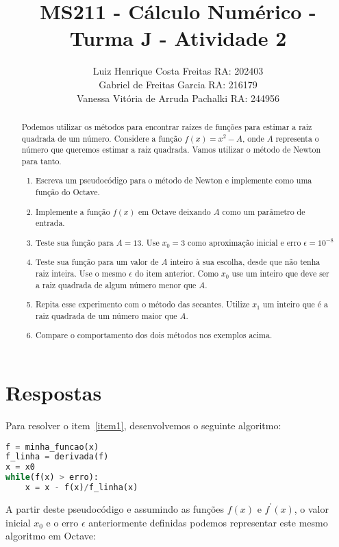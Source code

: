 \documentclass[a4paper]{article}
\title{MS211 - Cálculo Numérico - Turma J - Atividade 2
}
\author{Luiz Henrique Costa Freitas RA: 202403 \\
        Gabriel de Freitas Garcia RA: 216179 \\
        Vanessa Vitória de Arruda Pachalki RA: 244956
}
\begin{document}
\renewcommand{\abstractname}{Enunciado Atividade 2}
\maketitle

\begin{abstract}
Podemos utilizar os métodos para encontrar raízes de funções para estimar a raiz
quadrada de um número. Considere a função $f(x) = x^2 - A$, onde $A$ representa o número que queremos estimar a raiz quadrada. Vamos utilizar o método de Newton para tanto.
\begin{enumerate}
    \item Escreva um pseudocódigo para o método de Newton e implemente como uma função do Octave. \label{item1}
    \item Implemente a função $f(x)$ em Octave deixando $A$ como um parâmetro de entrada. \label{item2}
    \item Teste sua função para $A = 13$. Use $x_0 = 3$ como aproximação inicial e erro $\epsilon = 10^{-8}$\label{item3}
    \item Teste sua função para um valor de $A$ inteiro à sua escolha, desde que não tenha raiz inteira. Use o mesmo $\epsilon$ do item anterior. Como $x_0$ use um inteiro que
    deve ser a raiz quadrada de algum número menor que $A$. \label{item4}
    \item Repita esse experimento com o método das secantes. Utilize $x_1$ um inteiro que é a raiz quadrada de um número maior que $A$.
    \item Compare o comportamento dos dois métodos nos exemplos acima.
\end{enumerate}
   
\end{abstract}

\section{Respostas}

Para resolver o item~\ref{item1}, desenvolvemos o seguinte algoritmo: 
\begin{lstlisting}[language = python]
f = minha_funcao(x)
f_linha = derivada(f)
x = x0
while(f(x) > erro):
	x = x - f(x)/f_linha(x)
\end{lstlisting}

A partir deste pseudocódigo e assumindo as funções $f(x)$ e $f^{'}(x)$, o valor inicial $x_0$ e o erro $\epsilon$ anteriormente definidas podemos representar este mesmo algoritmo em Octave:
\end{document}

